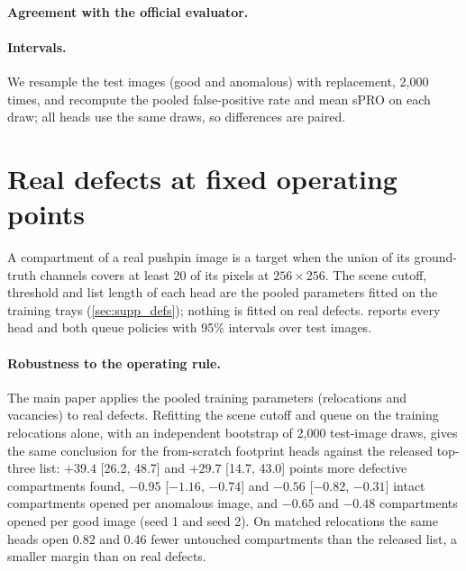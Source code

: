 \paragraph{Agreement with the official evaluator.} \officialSentence
\paragraph{Intervals.} We resample the test images (good and anomalous) with replacement, 2{,}000 times, and recompute the pooled false-positive rate and mean sPRO on each draw; all heads use the same draws, so differences are paired.
\begin{table}[t]
\centering
\caption{Native logical anomalies in every category with a retrained pair: AU-sPRO up to 5\% FPR (\%) with 95\% intervals, and image AUROC (\%).}
\label{tab:native_full}
\footnotesize\setlength{\tabcolsep}{3pt}

\end{table}

\section{Real defects at fixed operating points}
\label{sec:supp_op}
A compartment of a real pushpin image is a target when the union of its ground-truth channels covers at least 20 of its pixels at $256{\times}256$. The scene cutoff, threshold and list length of each head are the pooled parameters fitted on the training trays (\cref{sec:supp_defs}); nothing is fitted on real defects.  reports every head and both queue policies with 95\% intervals over test images.
\paragraph{Robustness to the operating rule.} The main paper applies the pooled training parameters (relocations and vacancies) to real defects. Refitting the scene cutoff and queue on the training relocations alone, with an independent bootstrap of 2{,}000 test-image draws, gives the same conclusion for the from-scratch footprint heads against the released top-three list: $+39.4$ [26.2, 48.7] and $+29.7$ [14.7, 43.0] points more defective compartments found, $-0.95$ [$-1.16$, $-0.74$] and $-0.56$ [$-0.82$, $-0.31$] intact compartments opened per anomalous image, and $-0.65$ and $-0.48$ compartments opened per good image (seed 1 and seed 2). On matched relocations the same heads open 0.82 and 0.46 fewer untouched compartments than the released list, a smaller margin than on real defects.

